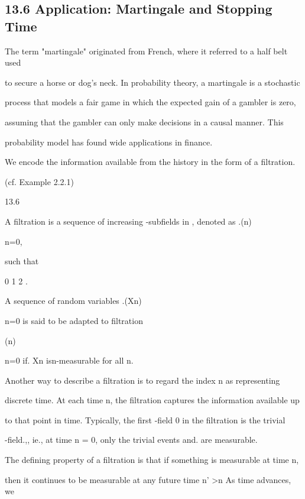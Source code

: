 \subsection*{13.6 Application: Martingale and Stopping Time}

The term "martingale" originated from French, where it referred to a half belt used

to secure a horse or dog's neck. In probability theory, a martingale is a stochastic

process that models a fair game in which the expected gain of a gambler is zero,

assuming that the gambler can only make decisions in a causal manner. This

probability model has found wide applications in finance.

We encode the information available from the history in the form of a filtration.

(cf. Example 2.2.1)

\begin{defbox}{13.6}
\end{defbox}

A filtration is a sequence of increasing \sigma-subfields in , denoted as .(n)\infty

n=0,

such that

0 \subseteq {}1 \subseteq {}2 \subseteq\cdot\cdot\cdot .

A sequence of random variables .(Xn)\infty

n=0 is said to be adapted to filtration

(n)\infty

n=0 if. Xn isn-measurable for all n.

Another way to describe a filtration is to regard the index n as representing

discrete time. At each time n, the filtration captures the information available up

to that point in time. Typically, the first \sigma-field 0 in the filtration is the trivial

\sigma-field.{\emptyset,\Omega }, ie., at time n = 0, only the trivial events \emptyset and. \Omega are measurable.

The defining property of a filtration is that if something is measurable at time n,

then it continues to be measurable at any future time n' >n As time advances, we


